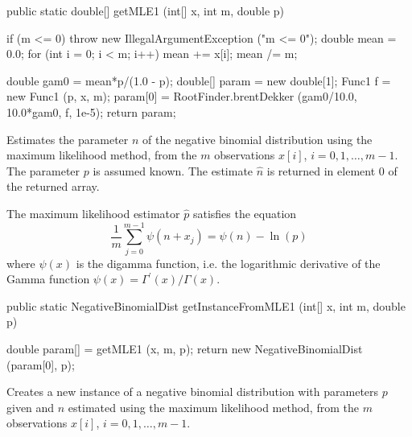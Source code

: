 \begin{code}

   public static double[] getMLE1 (int[] x, int m, double p)\begin{hide} {
      if (m <= 0)
         throw new IllegalArgumentException ("m <= 0");
      double mean = 0.0;
      for (int i = 0; i < m; i++)
         mean += x[i];
      mean /= m;

      double gam0 = mean*p/(1.0 - p);
      double[] param = new double[1];
      Func1 f = new Func1 (p, x, m);
      param[0] = RootFinder.brentDekker (gam0/10.0, 10.0*gam0, f, 1e-5);
      return param;
   }\end{hide}
\end{code}
\begin{tabb}
   Estimates the parameter $n$ of the negative binomial distribution
   using the maximum likelihood method, from the $m$ observations
   $x[i]$, $i = 0, 1, \ldots, m-1$. The parameter $p$ is assumed known.
   The estimate $\hat{n}$ is returned in element 0 of the returned array.
\begin{detailed}
   The maximum likelihood estimator $\hat{p}$ satisfies the equation
 \[
  \frac1m\sum_{j=0}^{m-1} \psi(n +x_j) = \psi(n) - \ln(p)
 \]
   where $\psi(x)$ is the digamma function, i.e. the logarithmic derivative
  of the Gamma function $\psi(x) = \Gamma^\prime(x)/\Gamma(x)$.
 \end{detailed}
\end{tabb}
\begin{htmlonly}
\end{htmlonly}
\begin{code}

   public static NegativeBinomialDist getInstanceFromMLE1 (int[] x, int m,
                                                           double p)\begin{hide} {
      double param[] = getMLE1 (x, m, p);
      return new NegativeBinomialDist (param[0], p);
   }\end{hide}
\end{code}
\begin{tabb}
   Creates a new instance of a negative binomial distribution with parameters
  $p$ given and $\hat{n}$ estimated using the maximum
   likelihood method, from the $m$ observations $x[i]$,
   $i = 0, 1, \ldots, m-1$.
\end{tabb}
